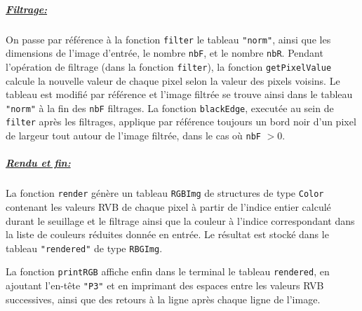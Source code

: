 \documentclass[a4paper, 11pt]{article}
\begin{document}
\subparagraph{\underline{\textit{Filtrage:}}} On passe par référence à la fonction \texttt{filter} le tableau \texttt{"norm"}, ainsi que les dimensions de l'image d'entrée, le nombre \texttt{nbF}, et le nombre \texttt{nbR}. Pendant l'opération de filtrage (dans la fonction \texttt{filter}), la fonction \texttt{getPixelValue} calcule la nouvelle valeur de chaque pixel selon la valeur des pixels voisins. Le tableau est modifié par référence et l'image filtrée se trouve ainsi dans le tableau \texttt{"norm"} à la fin des \texttt{nbF} filtrages. La fonction \texttt{blackEdge}, executée au sein de \texttt{filter} après les filtrages, applique par référence toujours un bord noir d'un pixel de largeur tout autour de l'image filtrée, dans le cas où \texttt{nbF} $> 0$.

\subparagraph{\underline{\textit{Rendu et fin:}}} La fonction \texttt{render} génère un tableau \texttt{RGBImg} de structures de type \texttt{Color} contenant les valeurs RVB de chaque pixel à partir de l'indice entier calculé durant le seuillage et le filtrage ainsi que la couleur à l'indice correspondant dans la liste de couleurs réduites donnée en entrée. Le résultat est stocké dans le tableau \texttt{"rendered"} de type \texttt{RBGImg}.

La fonction \texttt{printRGB} affiche enfin dans le terminal le tableau \texttt{rendered}, en ajoutant l'en-tête \texttt{"P3"} et en imprimant des espaces entre les valeurs RVB successives, ainsi que des retours à la ligne après chaque ligne de l'image.

\newpage
\end{document}
